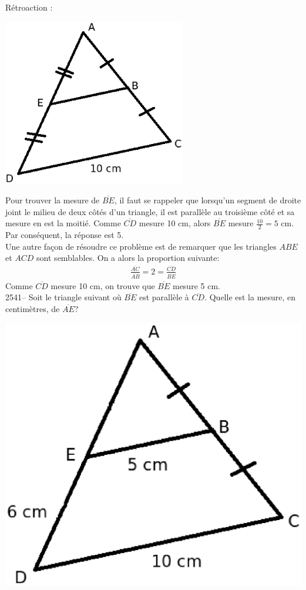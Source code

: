 \documentclass[letterpaper, 12pt]{article}
\begin{document}
R\'etroaction :\\
\begin{center}
 \includegraphics[width=8cm,bb=0 439 538 842]{Q2540.eps}
\end{center}
Pour trouver la mesure de $\overline{BE}$, il faut se rappeler que lorsqu'un segment de droite joint le milieu de deux c\^ot\'es d'un triangle, il est parall\`ele au troisi\`eme c\^ot\'e et sa mesure en est la moiti\'e. Comme $\overline{CD}$ mesure 10 cm, alors $\overline{BE}$ mesure $\frac{10}{2}=5$ cm.\\
Par cons\'equent, la r\'eponse est 5.\\
Une autre fa\c con de r\'esoudre ce probl\`eme est de remarquer que les triangles $ABE$ et $ACD$ sont semblables. On a alors la proportion suivante:
\begin{eqnarray*}
 \frac{\overline{AC}}{\overline{AB}}=2=\frac{\overline{CD}}{\overline{BE}}
\end{eqnarray*}
Comme $\overline{CD}$ mesure 10 cm, on trouve que $\overline{BE}$ mesure 5 cm.\\

2541-- Soit le triangle suivant o\`u $\overline{BE}$ est parall\`ele \`a $\overline{CD}$. Quelle est la mesure, en centim\`etres, de $\overline{AE}$?\\
\begin{center}
 \includegraphics[width=8 cm,bb=0 439 538 842]{Q2541.eps}
\end{center}
\end{document}
